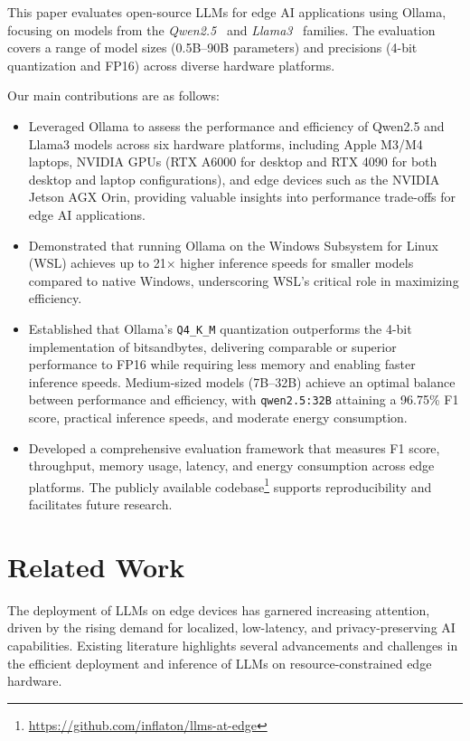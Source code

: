 \documentclass[conference]{IEEEtran}
\begin{document}
This paper evaluates open-source LLMs for edge AI applications using Ollama, focusing on models from the \textit{Qwen2.5}~\cite{yang2024qwen2} and \textit{Llama3}~\cite{grattafiori2024llama3} families. The evaluation covers a range of model sizes (0.5B–90B parameters) and precisions (4-bit quantization and FP16) across diverse hardware platforms.

Our main contributions are as follows:
\begin{itemize}
    \item Leveraged Ollama to assess the performance and efficiency of Qwen2.5 and Llama3 models across six hardware platforms, including Apple M3/M4 laptops, NVIDIA GPUs (RTX A6000 for desktop and RTX 4090 for both desktop and laptop configurations), and edge devices such as the NVIDIA Jetson AGX Orin, providing valuable insights into performance trade-offs for edge AI applications.
    
    \item Demonstrated that running Ollama on the Windows Subsystem for Linux (WSL) achieves up to 21× higher inference speeds for smaller models compared to native Windows, underscoring WSL's critical role in maximizing efficiency.
    
    \item Established that Ollama's \texttt{Q4\_K\_M} quantization outperforms the 4-bit implementation of bitsandbytes, delivering comparable or superior performance to FP16 while requiring less memory and enabling faster inference speeds. Medium-sized models (7B–32B) achieve an optimal balance between performance and efficiency, with \texttt{qwen2.5:32B} attaining a 96.75\% F1 score, practical inference speeds, and moderate energy consumption.
    
    \item Developed a comprehensive evaluation framework that measures F1 score, throughput, memory usage, latency, and energy consumption across edge platforms. The publicly available codebase\footnote{\url{https://github.com/inflaton/llms-at-edge}} supports reproducibility and facilitates future research.
\end{itemize}

\section{Related Work}

The deployment of LLMs on edge devices has garnered increasing attention, driven by the rising demand for localized, low-latency, and privacy-preserving AI capabilities. Existing literature highlights several advancements and challenges in the efficient deployment and inference of LLMs on resource-constrained edge hardware.
\end{document}
